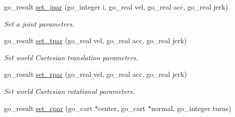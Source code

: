 \begin{DoxyCompactItemize}
\item 
go\-\_\-result \hyperlink{structgomotion_1_1go__motion__spec_a5871885be899af7b09a7ec0f12945ece}{set\-\_\-jpar} (go\-\_\-integer i, go\-\_\-real vel, go\-\_\-real acc, go\-\_\-real jerk)
\begin{DoxyCompactList}\small\item\em Set a joint parameters. \end{DoxyCompactList}\item 
go\-\_\-result \hyperlink{structgomotion_1_1go__motion__spec_a31bdbdc08c0f922214a9c53d7dbc37ae}{set\-\_\-tpar} (go\-\_\-real vel, go\-\_\-real acc, go\-\_\-real jerk)
\begin{DoxyCompactList}\small\item\em Set world Cartesian translation parameters. \end{DoxyCompactList}\item 
go\-\_\-result \hyperlink{structgomotion_1_1go__motion__spec_a162ebe0197582af6807b88070dc3fd80}{set\-\_\-rpar} (go\-\_\-real vel, go\-\_\-real acc, go\-\_\-real jerk)
\begin{DoxyCompactList}\small\item\em Set world Cartesian rotational parameters. \end{DoxyCompactList}\item 
\hypertarget{structgomotion_1_1go__motion__spec_a64789307eff349e4fba3e93d301c0f49}{go\-\_\-result \hyperlink{structgomotion_1_1go__motion__spec_a64789307eff349e4fba3e93d301c0f49}{set\-\_\-cpar} (go\-\_\-cart $\ast$center, go\-\_\-cart $\ast$normal, go\-\_\-integer turns)}\label{structgomotion_1_1go__motion__spec_a64789307eff349e4fba3e93d301c0f49}


\end{DoxyCompactItemize}
